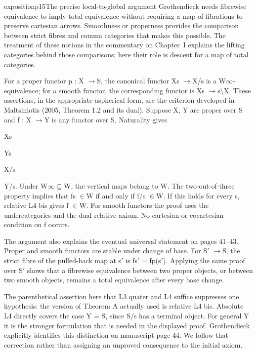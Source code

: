 \begin{dcomment}{exposition}{p15}{The precise local-to-global argument}
Grothendieck needs fibrewise equivalence to imply total equivalence without requiring a map of fibrations to preserve cartesian arrows. Smoothness or properness provides the comparison between strict fibres and comma categories that makes this possible. The treatment of these notions in the commentary on Chapter~I explains the lifting categories behind those comparisons; here their role is descent for a map of total categories.

For a proper functor p : X \ensuremath{\to}S, the canonical functor Xs \ensuremath{\to}X/s is a W\ensuremath{\infty}-equivalence; for a smooth functor, the corresponding functor is Xs \ensuremath{\to}s\textbackslash{}X. These assertions, in the appropriate aspherical form, are the criterion developed in Maltsiniotis (2005, Theorem 1.2 and its dual). Suppose X, Y are proper over S and f : X \ensuremath{\to}Y is any functor over S. Naturality gives

Xs

Ys

X/s

Y/s. Under W\ensuremath{\infty}\ensuremath{\subseteq}W, the vertical maps belong to W. The two-out-of-three property implies that fs \ensuremath{\in}W if and only if f/s \ensuremath{\in}W. If this holds for every s, relative L4 bis gives f \ensuremath{\in}W. For smooth functors the proof uses the undercategories and the dual relative axiom. No cartesian or cocartesian condition on f occurs.

The argument also explains the eventual universal statement on pages 41--43. Proper and smooth functors are stable under change of base. For S\ensuremath{\prime} \ensuremath{\to}S, the strict fibre of the pulled-back map at s\ensuremath{\prime} is fs\ensuremath{\prime} = fp(s\ensuremath{\prime}). Applying the same proof over S\ensuremath{\prime} shows that a fibrewise equivalence between two proper objects, or between two smooth objects, remains a total equivalence after every base change.

The parenthetical assertion here that L3 quater and L4 suffice suppresses one hypothesis: the version of Theorem A actually used is relative L4 bis. Absolute L4 directly covers the case Y = S, since S/s has a terminal object. For general Y it is the stronger formulation that is needed in the displayed proof. Grothendieck explicitly identifies this distinction on manuscript page 44. We follow that correction rather than assigning an unproved consequence to the initial axiom.

\end{dcomment}

